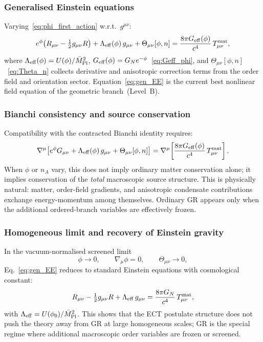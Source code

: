 \subsubsection*{Generalised Einstein equations}

Varying~\eqref{eq:phi_first_action} w.r.t.\ $g^{\mu\nu}$:
\begin{equation}
  \label{eq:gen_EE}
  e^\phi\!\left(R_{\mu\nu}-\tfrac{1}{2}g_{\mu\nu}R\right)
  + \Lambda_{\rm eff}(\phi)\,g_{\mu\nu}
  + \Theta_{\mu\nu}[\phi,n]
  = \frac{8\pi G_{\rm eff}(\phi)}{c^4}\,T_{\mu\nu}^{\rm mat},
\end{equation}
where $\Lambda_{\rm eff}(\phi)=U(\phi)/\bar M_{\rm Pl}^2$,
$G_{\rm eff}(\phi)=G_N e^{-\phi}$~\eqref{eq:Geff_phi},
and $\Theta_{\mu\nu}[\phi,n]$~\eqref{eq:Theta_n} collects derivative
and anisotropic correction terms from the order field and orientation
sector.
Equation~\eqref{eq:gen_EE} is the current best nonlinear field equation
of the geometric branch~(Level~B).

\subsubsection*{Bianchi consistency and source conservation}

Compatibility with the contracted Bianchi identity requires:
\begin{equation}
  \label{eq:bianchi_consistency}
  \nabla^\mu\!\left[
    e^\phi G_{\mu\nu}
    + \Lambda_{\rm eff}(\phi)\,g_{\mu\nu}
    + \Theta_{\mu\nu}[\phi,n]
  \right]
  = \nabla^\mu\!\left[
    \frac{8\pi G_{\rm eff}(\phi)}{c^4}\,T^{\rm mat}_{\mu\nu}
  \right].
\end{equation}
When $\phi$ or $n_A$ vary, this does not imply ordinary matter
conservation alone; it implies conservation of the \emph{total}
macroscopic source structure.
This is physically natural: matter, order-field gradients, and
anisotropic condensate contributions exchange energy-momentum
among themselves.
Ordinary GR appears only when the additional ordered-branch variables
are effectively frozen.

\subsubsection*{Homogeneous limit and recovery of Einstein gravity}

In the vacuum-normalised screened limit
\[
\phi\to 0,\qquad \nabla_\mu\phi=0,\qquad\Theta_{\mu\nu}\to 0,
\]
Eq.~\eqref{eq:gen_EE} reduces to standard Einstein equations with
cosmological constant:
\begin{equation}
  \label{eq:EE_standard}
  R_{\mu\nu}-\tfrac{1}{2}g_{\mu\nu}R
  + \Lambda_{\rm eff}\,g_{\mu\nu}
  = \frac{8\pi G_N}{c^4}\,T_{\mu\nu}^{\rm mat},
\end{equation}
with $\Lambda_{\rm eff}=U(\phi_0)/\bar M_{\rm Pl}^2$.
This shows that the ECT postulate structure does not push the theory
away from GR at large homogeneous scales; GR is the special regime
where additional macroscopic order variables are frozen or screened.


